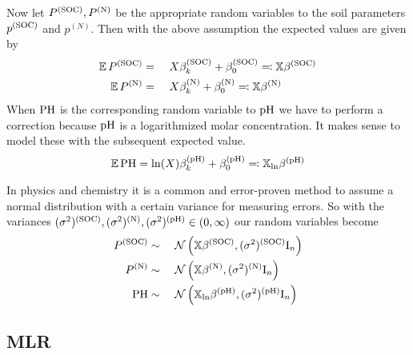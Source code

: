 		Now let $P^{\mathrm{(SOC)}},P^{\mathrm{(N)}}$ be the appropriate random variables to the soil parameters $p^{\mathrm{(SOC)}}$ and $p^{(N)}$.
		Then with the above assumption the expected values are given by
		\begin{alignat*}{3}
			\operatorname{\mathbb{E}} P^{\mathrm{(SOC)}} &=&&\ X\beta^{\mathrm{(SOC)}}_k + \beta^{\mathrm{(SOC)}}_0 \eqqcolon \mathbb{X}\beta^{\mathrm{(SOC)}} \\
			\operatorname{\mathbb{E}} P^{\mathrm{(N)}} &=&&\ X\beta^{\mathrm{(N)}}_k + \beta^{\mathrm{(N)}}_0 \eqqcolon \mathbb{X}\beta^{\mathrm{(N)}}
		\end{alignat*}
		When $\mathrm{PH}$ is the corresponding random variable to $\mathrm{pH}$ we have to perform a correction because $\mathrm{pH}$ is a logarithmized molar concentration.
		It makes sense to model these with the subsequent expected value.
		\[
			\operatorname{\mathbb{E}} \mathrm{PH} = \ln(X)\beta^{\mathrm{(pH)}}_k + \beta^{\mathrm{(pH)}}_0 \eqqcolon \mathbb{X}_{\ln}\beta^{\mathrm{(pH)}}
		\]

		In physics and chemistry it is a common and error-proven method to assume a normal distribution with a certain variance for measuring errors.
		So with the variances $(\sigma^2)^{\mathrm{(SOC)}},(\sigma^2)^{\mathrm{(N)}},(\sigma^2)^{\mathrm{(pH)}}\in(0,\infty)$ our random variables become
		\begin{alignat*}{3}
			P^\m{(SOC)} &\sim&&\ \FN\curvb{\mathbb{X}\beta^\m{(SOC)}, (\sigma^2)^\m{(SOC)}\idmat_n} \\
			P^\m{(N)} &\sim&&\ \FN\curvb{\mathbb{X}\beta^\m{(N)}, (\sigma^2)^\m{(N)}\idmat_n} \\
			\m{PH} &\sim&&\ \FN\curvb{\mathbb{X}_{\ln}\beta^\m{(pH)}, (\sigma^2)^\m{(pH)}\idmat_n}
		\end{alignat*}
	

	\subsection{MLR}
	\label{ssec:mlr}
	
